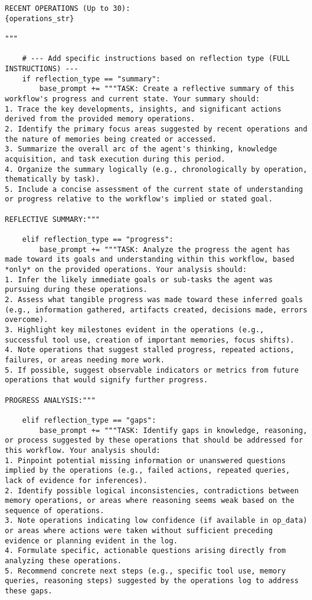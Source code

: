 \documentclass[12pt,a4paper]{article}
\begin{document}
\begin{pageablecode}
\begin{verbatim}
RECENT OPERATIONS (Up to 30):
{operations_str}

"""

    # --- Add specific instructions based on reflection type (FULL INSTRUCTIONS) ---
    if reflection_type == "summary":
        base_prompt += """TASK: Create a reflective summary of this workflow's progress and current state. Your summary should:
1. Trace the key developments, insights, and significant actions derived from the provided memory operations.
2. Identify the primary focus areas suggested by recent operations and the nature of memories being created or accessed.
3. Summarize the overall arc of the agent's thinking, knowledge acquisition, and task execution during this period.
4. Organize the summary logically (e.g., chronologically by operation, thematically by task).
5. Include a concise assessment of the current state of understanding or progress relative to the workflow's implied or stated goal.

REFLECTIVE SUMMARY:"""

    elif reflection_type == "progress":
        base_prompt += """TASK: Analyze the progress the agent has made toward its goals and understanding within this workflow, based *only* on the provided operations. Your analysis should:
1. Infer the likely immediate goals or sub-tasks the agent was pursuing during these operations.
2. Assess what tangible progress was made toward these inferred goals (e.g., information gathered, artifacts created, decisions made, errors overcome).
3. Highlight key milestones evident in the operations (e.g., successful tool use, creation of important memories, focus shifts).
4. Note operations that suggest stalled progress, repeated actions, failures, or areas needing more work.
5. If possible, suggest observable indicators or metrics from future operations that would signify further progress.

PROGRESS ANALYSIS:"""

    elif reflection_type == "gaps":
        base_prompt += """TASK: Identify gaps in knowledge, reasoning, or process suggested by these operations that should be addressed for this workflow. Your analysis should:
1. Pinpoint potential missing information or unanswered questions implied by the operations (e.g., failed actions, repeated queries, lack of evidence for inferences).
2. Identify possible logical inconsistencies, contradictions between memory operations, or areas where reasoning seems weak based on the sequence of operations.
3. Note operations indicating low confidence (if available in op_data) or areas where actions were taken without sufficient preceding evidence or planning evident in the log.
4. Formulate specific, actionable questions arising directly from analyzing these operations.
5. Recommend concrete next steps (e.g., specific tool use, memory queries, reasoning steps) suggested by the operations log to address these gaps.


\end{verbatim}
\end{pageablecode}
\end{document}
